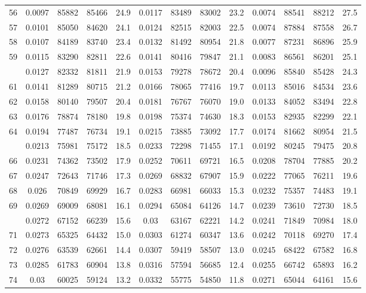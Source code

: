 \documentclass[
  14pt,
]{article}
\begin{document}
\begin{longtable}[t]{lcccccccccccc}
56 & 0.0097 & 85882 & 85466 & 24.9 & 0.0117 & 83489 & 83002 & 23.2 & 0.0074 & 88541 & 88212 & 27.5\\
57 & 0.0101 & 85050 & 84620 & 24.1 & 0.0124 & 82515 & 82003 & 22.5 & 0.0074 & 87884 & 87558 & 26.7\\
58 & 0.0107 & 84189 & 83740 & 23.4 & 0.0132 & 81492 & 80954 & 21.8 & 0.0077 & 87231 & 86896 & 25.9\\
59 & 0.0115 & 83290 & 82811 & 22.6 & 0.0141 & 80416 & 79847 & 21.1 & 0.0083 & 86561 & 86201 & 25.1\\
\addlinespace
60 & 0.0127 & 82332 & 81811 & 21.9 & 0.0153 & 79278 & 78672 & 20.4 & 0.0096 & 85840 & 85428 & 24.3\\
61 & 0.0141 & 81289 & 80715 & 21.2 & 0.0166 & 78065 & 77416 & 19.7 & 0.0113 & 85016 & 84534 & 23.6\\
62 & 0.0158 & 80140 & 79507 & 20.4 & 0.0181 & 76767 & 76070 & 19.0 & 0.0133 & 84052 & 83494 & 22.8\\
63 & 0.0176 & 78874 & 78180 & 19.8 & 0.0198 & 75374 & 74630 & 18.3 & 0.0153 & 82935 & 82299 & 22.1\\
64 & 0.0194 & 77487 & 76734 & 19.1 & 0.0215 & 73885 & 73092 & 17.7 & 0.0174 & 81662 & 80954 & 21.5\\
\addlinespace
65 & 0.0213 & 75981 & 75172 & 18.5 & 0.0233 & 72298 & 71455 & 17.1 & 0.0192 & 80245 & 79475 & 20.8\\
66 & 0.0231 & 74362 & 73502 & 17.9 & 0.0252 & 70611 & 69721 & 16.5 & 0.0208 & 78704 & 77885 & 20.2\\
67 & 0.0247 & 72643 & 71746 & 17.3 & 0.0269 & 68832 & 67907 & 15.9 & 0.0222 & 77065 & 76211 & 19.6\\
68 & 0.026 & 70849 & 69929 & 16.7 & 0.0283 & 66981 & 66033 & 15.3 & 0.0232 & 75357 & 74483 & 19.1\\
69 & 0.0269 & 69009 & 68081 & 16.1 & 0.0294 & 65084 & 64126 & 14.7 & 0.0239 & 73610 & 72730 & 18.5\\
\addlinespace
70 & 0.0272 & 67152 & 66239 & 15.6 & 0.03 & 63167 & 62221 & 14.2 & 0.0241 & 71849 & 70984 & 18.0\\
71 & 0.0273 & 65325 & 64432 & 15.0 & 0.0303 & 61274 & 60347 & 13.6 & 0.0242 & 70118 & 69270 & 17.4\\
72 & 0.0276 & 63539 & 62661 & 14.4 & 0.0307 & 59419 & 58507 & 13.0 & 0.0245 & 68422 & 67582 & 16.8\\
73 & 0.0285 & 61783 & 60904 & 13.8 & 0.0316 & 57594 & 56685 & 12.4 & 0.0255 & 66742 & 65893 & 16.2\\
74 & 0.03 & 60025 & 59124 & 13.2 & 0.0332 & 55775 & 54850 & 11.8 & 0.0271 & 65044 & 64161 & 15.6\\

\end{longtable}
\end{document}
